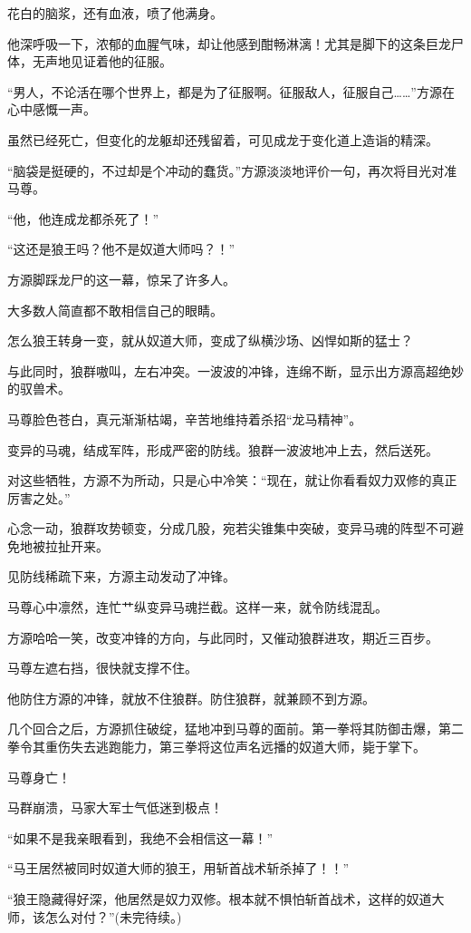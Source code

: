 \begin{this_body}
花白的脑浆，还有血液，喷了他满身。

他深呼吸一下，浓郁的血腥气味，却让他感到酣畅淋漓！尤其是脚下的这条巨龙尸体，无声地见证着他的征服。

“男人，不论活在哪个世界上，都是为了征服啊。征服敌人，征服自己……”方源在心中感慨一声。

虽然已经死亡，但变化的龙躯却还残留着，可见成龙于变化道上造诣的精深。

“脑袋是挺硬的，不过却是个冲动的蠢货。”方源淡淡地评价一句，再次将目光对准马尊。

“他，他连成龙都杀死了！”

“这还是狼王吗？他不是奴道大师吗？！”

方源脚踩龙尸的这一幕，惊呆了许多人。

大多数人简直都不敢相信自己的眼睛。

怎么狼王转身一变，就从奴道大师，变成了纵横沙场、凶悍如斯的猛士？

与此同时，狼群嗷叫，左右冲突。一波波的冲锋，连绵不断，显示出方源高超绝妙的驭兽术。

马尊脸色苍白，真元渐渐枯竭，辛苦地维持着杀招“龙马精神”。

变异的马魂，结成军阵，形成严密的防线。狼群一波波地冲上去，然后送死。

对这些牺牲，方源不为所动，只是心中冷笑：“现在，就让你看看奴力双修的真正厉害之处。”

心念一动，狼群攻势顿变，分成几股，宛若尖锥集中突破，变异马魂的阵型不可避免地被拉扯开来。

见防线稀疏下来，方源主动发动了冲锋。

马尊心中凛然，连忙艹纵变异马魂拦截。这样一来，就令防线混乱。

方源哈哈一笑，改变冲锋的方向，与此同时，又催动狼群进攻，期近三百步。

马尊左遮右挡，很快就支撑不住。

他防住方源的冲锋，就放不住狼群。防住狼群，就兼顾不到方源。

几个回合之后，方源抓住破绽，猛地冲到马尊的面前。第一拳将其防御击爆，第二拳令其重伤失去逃跑能力，第三拳将这位声名远播的奴道大师，毙于掌下。

马尊身亡！

马群崩溃，马家大军士气低迷到极点！

“如果不是我亲眼看到，我绝不会相信这一幕！”

“马王居然被同时奴道大师的狼王，用斩首战术斩杀掉了！！”

“狼王隐藏得好深，他居然是奴力双修。根本就不惧怕斩首战术，这样的奴道大师，该怎么对付？”(未完待续。)

\end{this_body}

